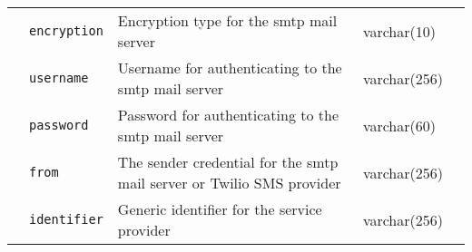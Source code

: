 \begin{landscape}
\begin{longtable}{ | m{} | m{} | m{} | m{} | m{} | }
        \cline{2-5}
                                                                         & \texttt{encryption}                       & Encryption type for the \acrshort{smtp} mail server                                                                 & varchar(10)   &                               \\
        \cline{2-5}
                                                                         & \texttt{username}                         & Username for authenticating to the \acrshort{smtp} mail server                                                      & varchar(256)  &                               \\
        \cline{2-5}
                                                                         & \texttt{password}                         & Password for authenticating to the \acrshort{smtp} mail server                                                      & varchar(60)   &                               \\
        \cline{2-5}
                                                                         & \texttt{from}                             & The sender credential for the \acrshort{smtp} mail server or Twilio SMS provider                                    & varchar(256)  &                               \\
        \cline{2-5}
                                                                         & \texttt{identifier}                       & Generic identifier for the service provider                                                                         & varchar(256)  &                               \\


\end{longtable}
\end{landscape}
